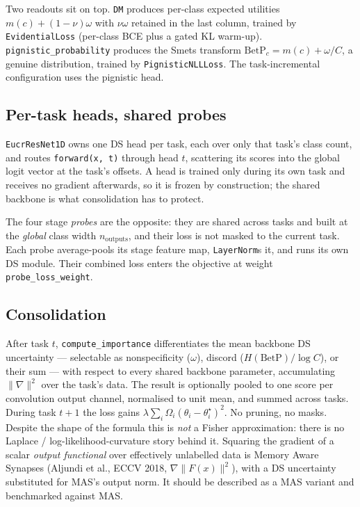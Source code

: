 \documentclass{article}
\begin{document}
Two readouts sit on top. \texttt{DM} produces per-class expected utilities
$m(c) + (1-\nu)\omega$ with $\nu\omega$ retained in the last column, trained by
\texttt{EvidentialLoss} (per-class BCE plus a gated KL warm-up).
\texttt{pignistic\_probability} produces the Smets transform
$\mathrm{BetP}_c = m(c) + \omega/C$, a genuine distribution, trained by
\texttt{PignisticNLLLoss}. The task-incremental configuration uses the pignistic
head.

\subsection{Per-task heads, shared probes}

\texttt{EucrResNet1D} owns one DS head per task, each over only that task's class
count, and routes \texttt{forward(x, t)} through head $t$, scattering its scores
into the global logit vector at the task's offsets. A head is trained only
during its own task and receives no gradient afterwards, so it is frozen by
construction; the shared backbone is what consolidation has to protect.

The four stage \emph{probes} are the opposite: they are shared across tasks and
built at the \emph{global} class width $n_{\text{outputs}}$, and their loss is
not masked to the current task. Each probe average-pools its stage feature map,
\texttt{LayerNorm}s it, and runs its own DS module. Their combined loss enters
the objective at weight \texttt{probe\_loss\_weight}.

\subsection{Consolidation}

After task $t$, \texttt{compute\_importance} differentiates the mean backbone DS
uncertainty --- selectable as nonspecificity ($\omega$), discord
($H(\mathrm{BetP})/\log C$), or their sum --- with respect to every shared
backbone parameter, accumulating $\lVert\nabla\rVert^2$ over the task's data.
The result is optionally pooled to one score per convolution output channel,
normalised to unit mean, and summed across tasks. During task $t+1$ the loss
gains $\lambda\sum_i \Omega_i(\theta_i - \theta_i^{\star})^2$. No pruning, no
masks. Despite the shape of the formula this is \emph{not} a Fisher
approximation: there is no Laplace / log-likelihood-curvature story behind it.
Squaring the gradient of a scalar \emph{output functional} over effectively
unlabelled data is Memory Aware Synapses (Aljundi et al., ECCV 2018,
$\nabla\lVert F(x)\rVert^2$), with a DS uncertainty substituted for MAS's output
norm. It should be described as a MAS variant and benchmarked against MAS.
\end{document}
